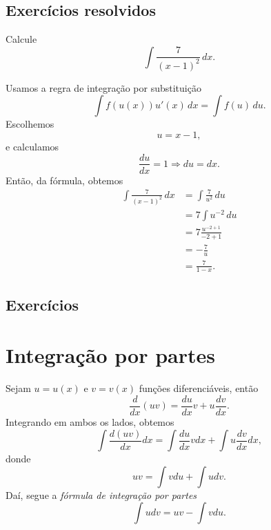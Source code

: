 \subsection*{Exercícios resolvidos}

\begin{exeresol}
  Calcule
  \begin{equation}
    \int \frac{7}{(x-1)^2}\,dx.
  \end{equation}
\end{exeresol}
\begin{resol}
  Usamos a regra de integração por substituição
  \begin{equation}
    \int f(u(x))u'(x)\,dx = \int f(u)\,du.
  \end{equation}
  Escolhemos
  \begin{equation}
    u = x-1,
  \end{equation}
  e calculamos
  \begin{equation}
    \frac{du}{dx} = 1 \Rightarrow du = dx.
  \end{equation}
  Então, da fórmula, obtemos
  \begin{align}
    \int \frac{7}{(x-1)^2}\,dx &= \int \frac{7}{u^2}\,du\\
                               &= 7\int u^{-2}\,du\\
                               &= 7\frac{u^{-2+1}}{-2+1}\\
                               &= -\frac{7}{u}\\
                               &= \frac{7}{1-x}.
  \end{align}
\end{resol}

\emconstrucao

\subsection*{Exercícios}

\emconstrucao

\section{Integração por partes}\label{cap_int_sec_partes}

Sejam $u=u(x)$ e $v=v(x)$ funções diferenciáveis, então
\begin{equation}
  \frac{d}{dx}(uv) = \frac{du}{dx}v + u\frac{dv}{dx}.
\end{equation}
Integrando em ambos os lados, obtemos
\begin{equation}
  \int \frac{d (uv)}{dx}dx = \int \frac{du}{dx}vdx + \int u\frac{dv}{dx}dx,
\end{equation}
donde
\begin{equation}
  uv = \int vdu + \int udv.
\end{equation}
Daí, segue a \emph{fórmula de integração por partes}
\begin{equation}
  \int udv = uv - \int vdu.
\end{equation}

